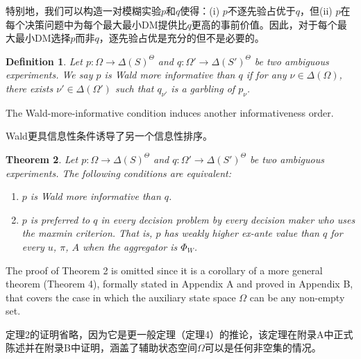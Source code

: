 \documentclass[12pt,a4paper]{article}
\newenvironment{original}
  {\par\vspace{4pt}\noindent\color{black}\ignorespaces}
  {\par\vspace{2pt}}
\newenvironment{translation}
  {\par\vspace{2pt}\noindent\color{myblue}\ignorespaces}
  {\par\vspace{6pt}}
\newtheorem{theorem}{Theorem}[section]
\newtheorem{definition}[theorem]{Definition}
\newcommand{\Delt}{\Delta}
\begin{document}
\begin{translation}
特别地，我们可以构造一对模糊实验$p$和$q$使得：(i) $p$不逐先验占优于$q$，但(ii) $p$在每个决策问题中为每个最大最小DM提供比$q$更高的事前价值。因此，对于每个最大最小DM选择$p$而非$q$，逐先验占优是充分的但不是必要的。
\end{translation}

\begin{definition}
Let $p:\Omega\to\Delt(S)^{\Theta}$ and $q:\Omega'\to\Delt(S')^{\Theta}$ be two ambiguous experiments. We say $p$ is Wald more informative than $q$ if for any $\nu\in\Delt(\Omega)$, there exists $\nu'\in\Delt(\Omega')$ such that $q_{\nu'}$ is a garbling of $p_{\nu}$.
\end{definition}

\begin{original}
The Wald-more-informative condition induces another informativeness order.
\end{original}

\begin{translation}
Wald更具信息性条件诱导了另一个信息性排序。
\end{translation}

\begin{theorem}
Let $p:\Omega\to\Delt(S)^{\Theta}$ and $q:\Omega'\to\Delt(S')^{\Theta}$ be two ambiguous experiments. The following conditions are equivalent:
\begin{enumerate}
    \item $p$ is Wald more informative than $q$.
    \item $p$ is preferred to $q$ in every decision problem by every decision maker who uses the maxmin criterion. That is, $p$ has weakly higher ex-ante value than $q$ for every $u$, $\pi$, $A$ when the aggregator is $\Phi_W$.
\end{enumerate}
\end{theorem}

\begin{original}
The proof of Theorem 2 is omitted since it is a corollary of a more general theorem (Theorem 4), formally stated in Appendix A and proved in Appendix B, that covers the case in which the auxiliary state space $\Omega$ can be any non-empty set.
\end{original}

\begin{translation}
定理2的证明省略，因为它是更一般定理（定理4）的推论，该定理在附录A中正式陈述并在附录B中证明，涵盖了辅助状态空间$\Omega$可以是任何非空集的情况。
\end{translation}
\end{document}
